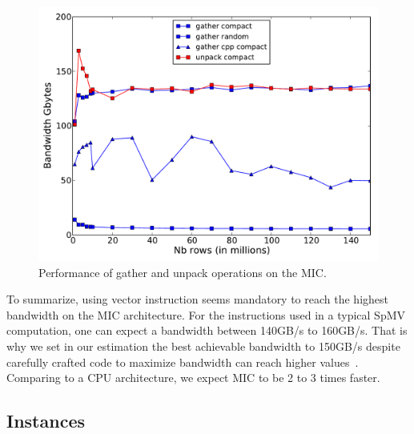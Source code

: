 \documentclass[10pt,conference,compsocconf]{IEEEtran}
\begin{document}
\begin{figure}
  \centering
  \includegraphics[width=\linewidth]{figures/bandwidth_gather_unpack.pdf}
  \caption{Performance of gather and unpack operations on the MIC.}
  \label{fig:band_gather} 
\end{figure}
%

To summarize, using vector instruction seems mandatory to reach the
highest bandwidth on the MIC architecture. For the instructions used
in a typical SpMV computation, one can expect a bandwidth between
140GB/s to 160GB/s. That is why we set in our estimation the best
achievable bandwidth to 150GB/s despite carefully crafted code to
maximize bandwidth can reach higher
values~\cite{Saule13-ARXIV}. Comparing to a CPU architecture, we
expect MIC to be 2 to 3 times faster.

\subsection{Instances}
\end{document}
